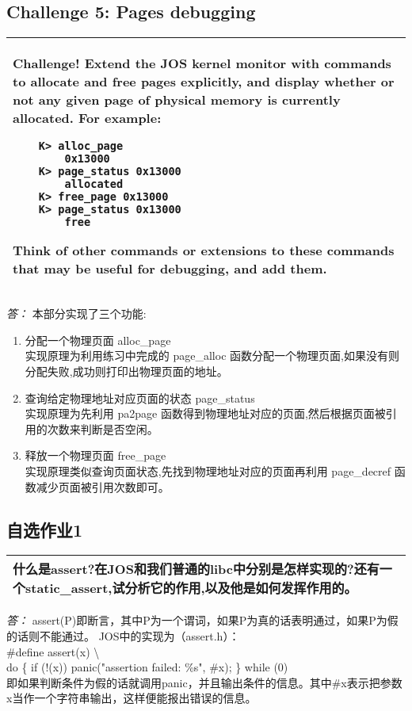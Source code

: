 \documentclass[11pt,a4paper]{article}
\begin{document}
\subsection{Challenge 5: Pages debugging}
\begin{tabular}{|p{\textwidth}|}
\hline
Challenge!  Extend the JOS kernel monitor with commands to allocate and free pages explicitly, and display whether or not any given page of physical memory is currently allocated. For example:
\begin{verbatim}
	K> alloc_page
		0x13000
	K> page_status 0x13000
		allocated
	K> free_page 0x13000
	K> page_status 0x13000
		free
\end{verbatim}
Think of other commands or extensions to these commands that may be useful for debugging, and add them. \\
\hline
\end{tabular}
\textit{\large{答：}}
本部分实现了三个功能:\\
\begin{enumerate}
\item 分配一个物理页面 alloc\_page\\
实现原理为利用练习中完成的 page\_alloc 函数分配一个物理页面,如果没有则分配失败,成功则打印出物理页面的地址。
\item 查询给定物理地址对应页面的状态 page\_status\\
实现原理为先利用 pa2page 函数得到物理地址对应的页面,然后根据页面被引用的次数来判断是否空闲。
\item 释放一个物理页面 free\_page\\
实现原理类似查询页面状态,先找到物理地址对应的页面再利用 page\_decref 函数减少页面被引用次数即可。
\end{enumerate}

\subsection{自选作业1}
\begin{tabular}{|p{\textwidth}|}
\hline
什么是assert?在JOS和我们普通的libc中分别是怎样实现的?还有一个static\_assert,试分析它的作用,以及他是如何发挥作用的。\\
\hline
\end{tabular}
\textit{\large{答：}}
assert(P)即断言，其中P为一个谓词，如果P为真的话表明通过，如果P为假的话则不能通过。
JOS中的实现为（assert.h）：\\
\#define assert(x)               \textbackslash \\
\hspace{2em}do \{ if (!(x)) panic("assertion failed: \%s", \#x); \} while (0)\\
即如果判断条件为假的话就调用panic，并且输出条件的信息。其中\#x表示把参数x当作一个字符串输出，这样便能报出错误的信息。\\
\end{document}
